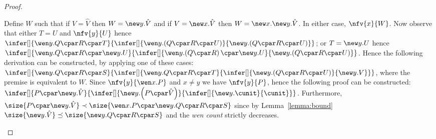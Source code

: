 \documentclass[UKenglish,acmsmall,authorversion]{acmart}
\theoremstyle{plain}
\begin{document}
{\begin{proof}
\begin{enumerate}[label=\textbf{\Alph*},ref=\Alph*,leftmargin=*]
{Define $W$ such that if $V = \hat{V}$ then $W = \new y. \hat{V}$ and if $V = \new x. \hat{V}$ then $W = \new x. \new y. \hat{V}$. In either case, $\nfv{x}{W}$.
Now observe that either $T = U$ and $\nfv{y}{U}$ hence
$\infer[]{
\wen y. Q \cpar R \cpar T
}{
\infer[]{
 \mathopen{\wen y.} \left(Q \cpar R \cpar U\right) 
}{
 \mathopen{\new y.} \left(Q \cpar R \cpar U\right)
}}$;
or $T = \new y. U$ hence $
\infer[]{
\wen y. Q \cpar R \cpar \new y. U
}{
\infer[]{
 \mathopen{\wen y.} \left(Q \cpar R\right) \cpar \mathopen{\new y.} U 
}{
\mathopen{\new y.} \left(Q \cpar R \cpar U\right)
}}$.
Hence the following derivation can be constructed, by applying one of these cases:
$
\infer[]{
\wen y. Q \cpar R \cpar S
}{
\infer[]{
 \wen y. Q \cpar R \cpar T
}{
\infer[]{
\mathopen{\new y.} \left( Q \cpar R \cpar U \right)
}{
\new y. V
}}}
$, where the premise is equivalent to $W$.
Since $\nfv{y}{\wen x. P}$ and $x \not= y$ we have $\nfv{y}{P}$,
hence the following proof can be constructed:
$
\infer[]{
P \cpar \new y. \hat{V}
}{
\infer[]{
\mathopen{\new y.}\left( P \cpar \hat{V} \right)
}{
\infer[]{
\new y. \cunit 
}{
\cunit
}}}$.
Furthermore, $\size{ P \cpar \new y. \hat{V} } \prec \size{ \wen x. P \cpar \new y. Q \cpar R \cpar S }$ since by Lemma~\ref{lemma:bound} $\size{ \new y. \hat{V} } \preceq \size{\new y. Q \cpar R \cpar S}$
and the \textit{wen count} strictly decreases.
\smallskip











}
\end{enumerate}
\end{proof}}
\end{document}

